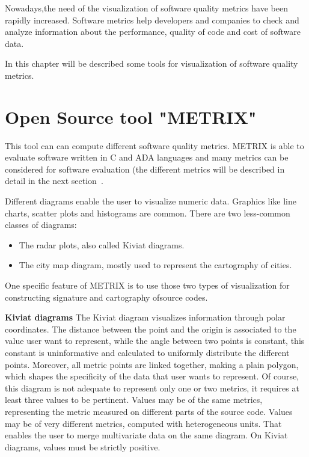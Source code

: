 Nowadays,the need of the visualization of software quality metrics have been rapidly increased. Software metrics help developers and companies to check and analyze information about the performance, quality of code and cost of software data.

In this chapter will be described some tools for visualization of software quality metrics.

\section{Open Source tool "METRIX"}

This tool can can compute different software quality 
metrics. METRIX is  able  to  evaluate  software  written  in  C  and  ADA  languages  and  many  metrics  can  be  considered  for  software evaluation (the different metrics will be described in detail in the next section~\cite{metrix}. 

Different  diagrams  enable  the  user  to  visualize  numeric  data.  Graphics  like  line  charts,  scatter  plots  and  
histograms are common. 
There are two less-common classes of diagrams: 
\begin{itemize}
	\item The radar plots, also called Kiviat diagrams.
	\item The city map diagram, mostly used to represent the cartography of 
	cities.
\end{itemize}
One specific feature of METRIX is to use those two types of visualization for constructing signature and cartography ofsource codes.
 
\textbf{Kiviat diagrams}
The Kiviat diagram visualizes information through polar coordinates. The  distance between the  point and  the origin is associated to the value user want to represent, while the angle between two points is constant, this constant is uninformative  and  calculated  to  uniformly  distribute  the  different  points.  Moreover, all metric points are linked  
together, making a plain polygon, which shapes the specificity of the data that user wants to represent. Of  course, this diagram is not adequate to represent only one or two metrics, it requires at least three values to be pertinent. Values may be of the same metrics, representing the metric measured on different parts of the source code. Values may be 
of  very  different  metrics,  computed  with  heterogeneous  units.  That  enables  the  user  to  merge  multivariate  data  on  the same diagram. On Kiviat diagrams, values must be strictly positive. 

